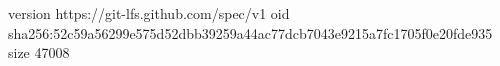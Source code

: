 version https://git-lfs.github.com/spec/v1
oid sha256:52c59a56299e575d52dbb39259a44ac77dcb7043e9215a7fc1705f0e20fde935
size 47008
